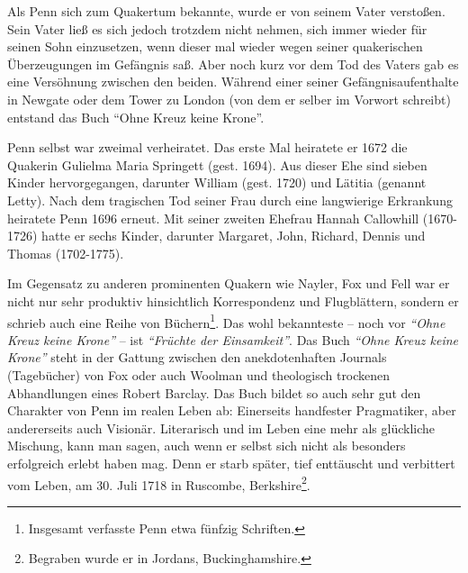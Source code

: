 Als Penn sich zum Quakertum bekannte, wurde er von seinem Vater verstoßen.
Sein Vater ließ es sich jedoch trotzdem nicht nehmen, sich immer wieder für seinen
Sohn einzusetzen, wenn dieser mal wieder
wegen seiner quakerischen Überzeugungen im Gefängnis saß. Aber noch
kurz vor dem Tod des Vaters gab es eine Versöhnung zwischen den beiden. Während
einer seiner Gefängnisaufenthalte in Newgate oder dem Tower zu London (von dem er selber im Vorwort schreibt) entstand
das Buch "`Ohne Kreuz keine Krone"'.

\medskip

Penn selbst war zweimal verheiratet. Das erste Mal heiratete er 1672 die
Quakerin Gulielma Maria Springett (gest. 1694). Aus dieser Ehe sind sieben Kinder
hervorgegangen, darunter William (gest. 1720) und Lätitia (genannt Letty). Nach dem tragischen Tod seiner Frau
durch eine langwierige Erkrankung heiratete Penn 1696 erneut. Mit seiner zweiten
Ehefrau Hannah Callowhill (1670-1726) hatte
er sechs Kinder, darunter Margaret, John, Richard, Dennis und Thomas (1702-1775).

\medskip

Im Gegensatz zu anderen prominenten Quakern wie Nayler, Fox und Fell war er nicht nur sehr produktiv hinsichtlich Korrespondenz und
Flugblättern, sondern er schrieb auch eine Reihe von
Büchern\footnote{Insgesamt verfasste Penn etwa fünfzig Schriften.}.
Das wohl bekannteste -- noch vor \textit{"`Ohne Kreuz keine Krone"'} -- ist
\textit{"`Früchte der Einsamkeit"'}. Das Buch \textit{"`Ohne Kreuz keine
Krone"'} steht in der Gattung zwischen den anekdotenhaften Journals
(Tagebücher) von Fox
oder auch Woolman und theologisch trockenen
Abhandlungen eines Robert Barclay. Das Buch
bildet so auch sehr gut den Charakter von Penn im realen Leben ab: Einerseits
handfester Pragmatiker, aber andererseits auch Visionär. Literarisch und im Leben
eine mehr als glückliche Mischung, kann man sagen, auch wenn er selbst sich
nicht als besonders erfolgreich erlebt haben mag. Denn er starb später, tief
enttäuscht und verbittert vom Leben, am 30. Juli 1718 in Ruscombe, Berkshire\footnote{Begraben wurde er in
Jordans, Buckinghamshire. }.

